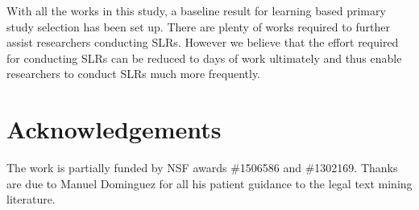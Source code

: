 \documentclass[final,twocolumn,5p]{elsarticle}
\theoremstyle{break}
\begin{document}
With all the works in this study, a baseline result for learning based primary study selection has been set up. There are plenty of works required to further assist researchers conducting SLRs. However we believe that the effort required for conducting SLRs can be reduced to days of work ultimately and thus enable researchers to conduct SLRs much more frequently.

	\section*{Acknowledgements}
		The work is partially funded by NSF  awards \#1506586 and \#1302169. Thanks are due to Manuel Dominguez for all his
		patient guidance to the legal text mining literature.

 
\vspace*{0.5mm}
 
 
% 

 
% 
\balance




\end{document}
